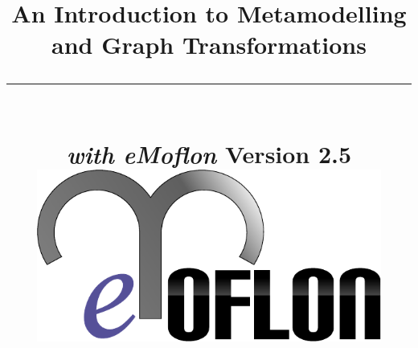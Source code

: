 \title{
\flushright
{\LARGE\bfseries An Introduction to Metamodelling\\
and Graph Transformations}
\noindent\rule[-1ex]{\textwidth}{5pt}\\[2.5ex]
\hfill\emph{\LARGE\bfseries with eMoflon}
\flushleft
{\small Version 2.5}
\flushright
\includegraphics[width=0.85\textwidth]{pics/eMoflon3} 
}

\date{}  
\author{} 